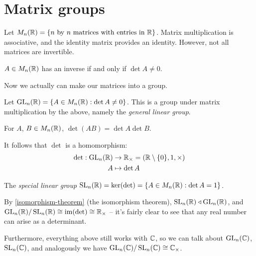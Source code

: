 \documentclass{../template/note}
\begin{document}
    \section{Matrix groups}

    Let \(M_n(\mathbb R) = \{n \text{ by } n \text{ matrices with entries in } \mathbb R\}\). Matrix multiplication is associative, and the identity matrix provides an identity. However, not all matrices are invertible.
    
    \begin{lemma}
        \(A \in M_n(\mathbb R)\) has an inverse if and only if \(\det A \neq 0\).
    \end{lemma}
    
    Now we actually can make our matrices into a group.

    \begin{definition}
        Let \(\operatorname{GL}_n(\mathbb R) = \{A \in M_n(\mathbb R) : \det A \neq 0\}\). This is a group under matrix multiplication by the above, namely the \emph{general linear group}.
    \end{definition}
    
    \begin{lemma}
        For \(A\), \(B \in M_n(\mathbb R)\), \(\det(AB) = \det A \det B\).
    \end{lemma}
    
    \begin{corollary}
        It follows that \(\det\) is a homomorphism:
        \begin{align*}
            \det: \operatorname{GL}_n(\mathbb R) &\to \mathbb R_\times = (\mathbb R \setminus \{0\}, 1, \times) \\
            A &\mapsto \det A
        \end{align*}
    \end{corollary}
    
    \begin{definition}
        The \emph{special linear group} \(\operatorname{SL}_n(\mathbb R) = \ker (\det) = \{A \in M_n(\mathbb R): \det A = 1\}\).
    \end{definition}
    
    By \cref{isomorphism-theorem} (the isomorphism theorem), \(\operatorname{SL}_n(\mathbb R) \triangleleft \operatorname{GL}_n(\mathbb R)\), and \(\operatorname{GL}_n(\mathbb R) / \operatorname{SL}_n(\mathbb R) \cong \operatorname{im}(\det) \cong \mathbb R_\times\) -- it's fairly clear to see that any real number can arise as a determinant.

    Furthermore, everything above still works with \(\mathbb C\), so we can talk about \(\operatorname{GL}_n(\mathbb C)\), \(\operatorname{SL}_n(\mathbb C)\), and analogously we have \(\operatorname{GL}_n(\mathbb C) / \operatorname{SL}_n(\mathbb C) \cong \mathbb C_\times\).
    
\end{document}
